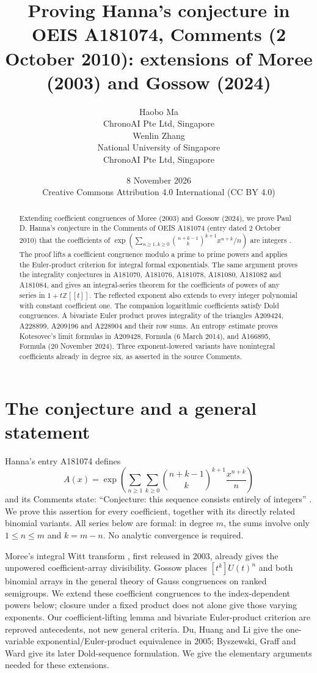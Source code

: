 \documentclass[11pt]{article}
\title{Proving Hanna's conjecture in OEIS A181074, Comments (2 October 2010): extensions of Moree (2003) and Gossow (2024)}
\author{Haobo Ma\\{\small ChronoAI Pte Ltd, Singapore}\\[0.7em]
Wenlin Zhang\\{\small National University of Singapore}\\{\small ChronoAI Pte Ltd, Singapore}}
\date{8 November 2026\\[0.5em]{\small Creative Commons Attribution 4.0 International (CC BY 4.0)}}
\begin{document}
\maketitle
\begin{abstract}
Extending coefficient congruences of Moree (2003) and Gossow (2024),
we prove Paul D. Hanna's conjecture in the Comments of OEIS A181074
(entry dated 2 October 2010) that the coefficients of
\(\exp(\sum_{n\ge1,k\ge0}\binom{n+k-1}{k}^{k+1}x^{n+k}/n)\)
are integers \cite{moree,gossow,h74}. The proof lifts a coefficient congruence modulo a prime to
prime powers and applies the Euler-product criterion for integral formal
exponentials. The same argument proves the integrality conjectures in
A181070, A181076, A181078, A181080, A181082 and A181084, and gives an integral-series
theorem for the coefficients of powers of any series in \(1+t\mathbb Z[[t]]\).
The reflected exponent also extends to every integer polynomial with constant
coefficient one. The companion logarithmic coefficients satisfy Dold congruences.
A bivariate Euler product proves integrality of the triangles A209424,
A228899, A209196 and A228904 and their row sums.
An entropy estimate proves Kotesovec's limit formulas in A209428, Formula
(6 March 2014), and A166895, Formula (20 November 2024).
Three exponent-lowered variants have nonintegral
coefficients already in degree six, as asserted in the source Comments.
\end{abstract}

\section{The conjecture and a general statement}

Hanna's entry A181074 defines
\begin{equation}\label{eq:main}
 A(x)=\exp\left(\sum_{n\ge1}\sum_{k\ge0}
     \binom{n+k-1}{k}^{k+1}\frac{x^{n+k}}{n}\right)
\end{equation}
and its Comments state: ``Conjecture: this sequence consists entirely of
integers'' \cite{h74}. We prove this assertion for every coefficient, together
with its directly related binomial variants. All series below are formal:
in degree \(m\), the sums involve only \(1\le n\le m\) and \(k=m-n\).
No analytic convergence is required.

Moree's integral Witt transform \cite[Theorem 4(2)]{moree}, first released
in 2003, already gives the unpowered coefficient-array divisibility.
Gossow \cite[Theorem 3.3, (3.1), and Example 3.4]{gossow} places
$[t^k]U(t)^n$ and both binomial arrays in the general theory of Gauss
congruences on ranked semigroups. We extend these coefficient congruences
to the index-dependent powers below; closure under a fixed product does
not alone give those varying exponents. Our coefficient-lifting lemma
and bivariate Euler-product criterion are reproved antecedents, not new
general criteria. Du, Huang and Li \cite[Theorem 2(2)--(3)]{dhl} give the
one-variable exponential/Euler-product equivalence in 2005; Byszewski,
Graff and Ward \cite[Theorem 2.5 and Lemma 2.6]{bgw} give its later Dold-sequence
formulation. We give the elementary arguments needed for these extensions.
\end{document}
